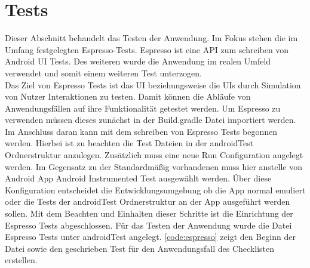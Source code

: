 \section{Tests}\label{sec:tests}
Dieser Abschnitt behandelt das Testen der Anwendung. Im Fokus stehen die im Umfang festgelegten Espresso-Tests. Espresso ist eine \ac{API} zum schreiben von Android \ac{UI} Tests. Des weiteren wurde die Anwendung im realen Umfeld verwendet und somit einem weiteren Test unterzogen.\\
Das Ziel von Espresso Tests ist das \ac{UI} beziehungsweise die \acp{UI} durch Simulation von Nutzer Interaktionen zu testen. Damit können die Abläufe von Anwendungsfällen auf ihre Funktionalität getestet werden. Um Espresso zu verwenden müssen dieses zunächst in der Build.gradle Datei importiert werden. Im Anschluss daran kann mit dem schreiben von Espresso Tests begonnen werden. Hierbei ist zu beachten die Test Dateien in der androidTest Ordnerstruktur anzulegen. Zusätzlich muss eine neue \glqq Run Configuration\grqq{} angelegt werden. Im Gegensatz zu der Standardmäßig vorhandenen muss hier anstelle von Android App Android Instrumented Test ausgewählt werden. Über diese Konfiguration entscheidet die Entwicklungsumgebung ob die App normal emuliert oder die Tests der androidTest Ordnerstruktur an der App ausgeführt werden sollen. Mit dem Beachten und Einhalten dieser Schritte ist die Einrichtung der Espresso Tests abgeschlossen. Für das Testen der Anwendung wurde die Datei \glqq Espresso Tests\grqq{} unter androidTest angelegt. \autoref{code:espresso} zeigt den Beginn der Datei sowie den geschrieben Test für den Anwendungsfall des Checklisten erstellen.
\\


